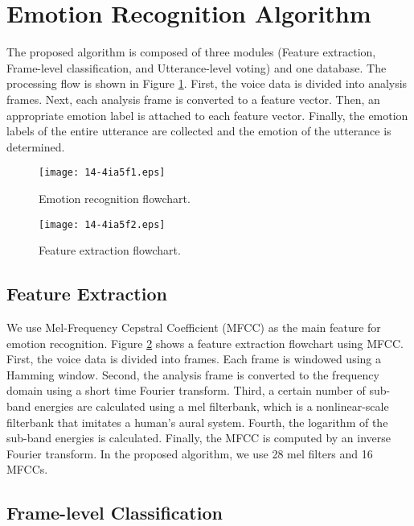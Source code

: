 \documentclass[english]{jnlp_1.3e}
\begin{document}
\section{Emotion Recognition Algorithm}

The proposed algorithm is composed of three modules (Feature extraction, Frame-level classification, and Utterance-level voting) and one database. The processing flow is shown in Figure \ref{fig01}. First, the voice data is divided into analysis frames. Next, each analysis frame is converted to a feature vector. Then, an appropriate emotion label is attached to each feature vector. Finally, the emotion labels of the entire utterance are collected and the emotion of the utterance is determined.

\begin{figure}[b]
\begin{center}
    \texttt{[image: 14-4ia5f1.eps]}
\caption{Emotion recognition flowchart.}
\label{fig01}
\end{center}
\end{figure}
\begin{figure}[b]
\begin{center}
    \texttt{[image: 14-4ia5f2.eps]}
\caption{Feature extraction flowchart.}
\label{fig02}
\end{center}
\end{figure}



\subsection{Feature Extraction}

We use Mel-Frequency Cepstral Coefficient (MFCC) \cite{Davis1980} as the main feature for emotion recognition. Figure \ref{fig02} shows a feature extraction flowchart using MFCC. First, the voice data is divided into frames. Each frame is windowed using a Hamming window. Second, the analysis frame is converted to the frequency domain using a short time Fourier transform. Third, a certain number of sub-band energies are calculated using a mel filterbank, which is a nonlinear-scale filterbank that imitates a human's aural system. Fourth, the logarithm of the sub-band energies is calculated. Finally, the MFCC is computed by an inverse Fourier transform. In the proposed algorithm, we use 28 mel filters and 16 MFCCs.


\subsection{Frame-level Classification}
\end{document}
